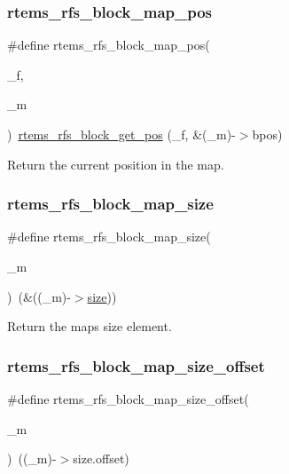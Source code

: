 \subsubsection{\texorpdfstring{rtems\_rfs\_block\_map\_pos}{rtems\_rfs\_block\_map\_pos}}
{\footnotesize\ttfamily \#define rtems\+\_\+rfs\+\_\+block\+\_\+map\+\_\+pos(\begin{DoxyParamCaption}\item[{}]{\+\_\+f,  }\item[{}]{\+\_\+m }\end{DoxyParamCaption})~\mbox{\hyperlink{rtems-rfs-block_8c_a76f70461e9f76aa1f6739a13a8f26735}{rtems\+\_\+rfs\+\_\+block\+\_\+get\+\_\+pos}} (\+\_\+f, \&(\+\_\+m)-\/$>$bpos)}

Return the current position in the map. \mbox{\label{rtems-rfs-block_8h_ae3b8d48771938228784bb2a5edaff697}} 
\subsubsection{\texorpdfstring{rtems\_rfs\_block\_map\_size}{rtems\_rfs\_block\_map\_size}}
{\footnotesize\ttfamily \#define rtems\+\_\+rfs\+\_\+block\+\_\+map\+\_\+size(\begin{DoxyParamCaption}\item[{}]{\+\_\+m }\end{DoxyParamCaption})~(\&((\+\_\+m)-\/$>$\mbox{\hyperlink{sun4u_2tte_8h_a245260f6f74972558f61b85227df5aae}{size}}))}

Return the map\textquotesingle{}s size element. \mbox{\label{rtems-rfs-block_8h_a38a9929ea04e6dd7f761b7bb5013fcb8}} 
\subsubsection{\texorpdfstring{rtems\_rfs\_block\_map\_size\_offset}{rtems\_rfs\_block\_map\_size\_offset}}
{\footnotesize\ttfamily \#define rtems\+\_\+rfs\+\_\+block\+\_\+map\+\_\+size\+\_\+offset(\begin{DoxyParamCaption}\item[{}]{\+\_\+m }\end{DoxyParamCaption})~((\+\_\+m)-\/$>$size.\+offset)}

